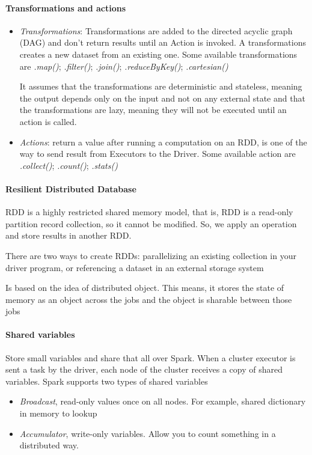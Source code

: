 \paragraph{Transformations and actions}
\begin{itemize}
    \item \textit{Transformations}: Transformations are added to the directed acyclic graph (DAG) and don’t return results until an Action is invoked. A transformations creates a new dataset from an existing one. Some available transformations are \textit{.map()}; \textit{.filter()}; \textit{.join()}; \textit{.reduceByKey()}; \textit{.cartesian()}

    It assumes that the transformations are deterministic and stateless, meaning the output depends only on the input and not on any external state and that the transformations are lazy, meaning they will not be executed until an action is called.
    \item \textit{Actions}: return a value after running a computation on an RDD, is one of the way to send result from Executors to the Driver. Some available action are \textit{.collect()}; \textit{.count()}; \textit{.stats()}
\end{itemize}

\paragraph{Resilient Distributed Database} 
RDD is a highly restricted shared memory model, that is, RDD is a read-only partition record collection, so it cannot be modified. So, we apply an operation and store results in another RDD. 

There are two ways to create RDDs: parallelizing an existing collection in your driver program, or referencing a dataset in an external storage system

Is based on the idea of distributed object. This means, it stores the state of memory as an object across the jobs and the object is sharable between those jobs

\paragraph{Shared variables}
Store small variables and share that all over Spark. When a cluster executor is sent a task by the driver, each node of the cluster receives a copy of shared variables. Spark supports two types of shared variables
\begin{itemize}
    \item \textit{Broadcast}, read-only values once on all nodes. For example, shared dictionary in memory to lookup
    \item \textit{Accumulator}, write-only variables. Allow you to count something in a distributed way.
\end{itemize}

